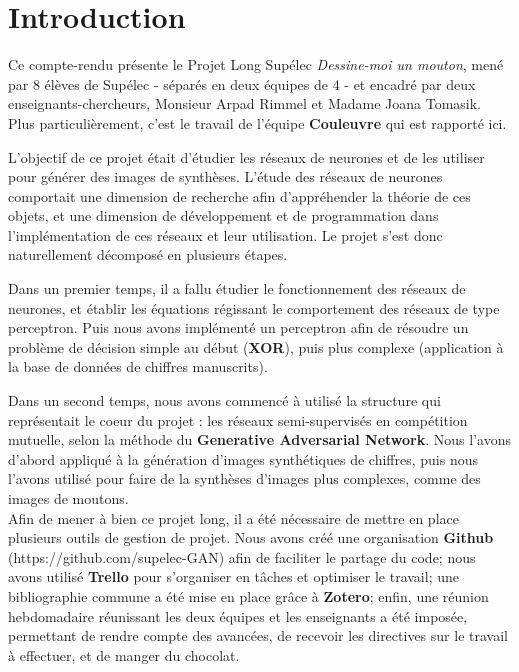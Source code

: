 \chapter*{Introduction}

Ce compte-rendu présente le Projet Long Supélec \textit{Dessine-moi un mouton}, mené par 8 élèves de Supélec - séparés en deux équipes de 4 - et encadré par deux enseignants-chercheurs, Monsieur Arpad Rimmel et Madame Joana Tomasik. Plus particulièrement, c'est le travail de l'équipe \textbf{Couleuvre} qui est rapporté ici. 

L'objectif de ce projet était d'étudier les réseaux de neurones et de les utiliser pour générer des images de synthèses. L'étude des réseaux de neurones comportait une dimension de recherche afin d'appréhender la théorie de ces objets, et une dimension de développement et de programmation dans l'implémentation de ces réseaux et leur utilisation. Le projet s'est donc naturellement décomposé en plusieurs étapes.

Dans un premier temps, il a fallu étudier le fonctionnement des réseaux de neurones, et établir les équations régissant le comportement des réseaux de type perceptron. Puis nous avons implémenté un perceptron afin de résoudre un problème de décision simple au début (\textbf{XOR}), puis plus complexe (application à la base de données de chiffres manuscrits).

Dans un second temps, nous avons commencé à utilisé la structure qui représentait le coeur du projet : les réseaux semi-supervisés en compétition mutuelle, selon la méthode du \textbf{Generative Adversarial Network}. Nous l'avons d'abord appliqué à la génération d'images synthétiques de chiffres, puis nous l'avons utilisé pour faire de la synthèses d'images plus complexes, comme des images de moutons.\\

Afin de mener à bien ce projet long, il a été nécessaire de mettre en place plusieurs outils de gestion de projet. Nous avons créé une organisation \textbf{Github} (https://github.com/supelec-GAN) afin de faciliter le partage du code; nous avons utilisé \textbf{Trello} pour s'organiser en tâches et optimiser le travail; une bibliographie commune a été mise en place grâce à \textbf{Zotero}; enfin, une réunion hebdomadaire réunissant les deux équipes et les enseignants a été imposée, permettant de rendre compte des avancées, de recevoir les directives sur le travail à effectuer, et de manger du chocolat. 

\newpage
